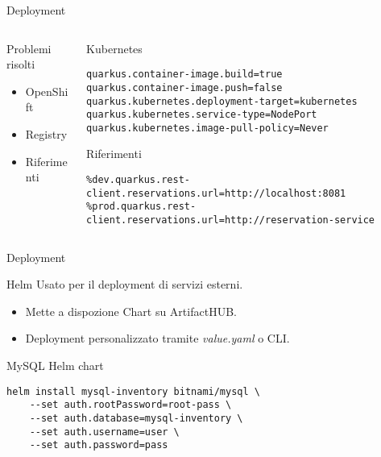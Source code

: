 \begin{frame}[fragile]{Deployment}
    \begin{columns}
        \begin{column}{.3\textwidth}
            \begin{block}{Problemi risolti}
                \begin{itemize}
                    \item OpenShift
                    \item Registry
                    \item Riferimenti
                \end{itemize}
            \end{block}
        \end{column}
        \begin{column}{.7\textwidth}
            \begin{block}{Kubernetes}
                \begin{verbatim}
quarkus.container-image.build=true
quarkus.container-image.push=false
quarkus.kubernetes.deployment-target=kubernetes
quarkus.kubernetes.service-type=NodePort
quarkus.kubernetes.image-pull-policy=Never
                \end{verbatim}
            \end{block}
            \begin{block}{Riferimenti}
                \begin{verbatim}
%dev.quarkus.rest-client.reservations.url=http://localhost:8081
%prod.quarkus.rest-client.reservations.url=http://reservation-service
                \end{verbatim}
            \end{block}
        \end{column}
    \end{columns}
\end{frame}

\begin{frame}[fragile]{Deployment}
    \begin{block}{Helm}
        Usato per il deployment di servizi esterni.
        \begin{itemize}
            \item Mette a dispozione Chart su ArtifactHUB.
            \item Deployment personalizzato tramite \textit{value.yaml} o CLI.
        \end{itemize}
    \end{block}
    \begin{block}{MySQL Helm chart}
        \begin{verbatim}
helm install mysql-inventory bitnami/mysql \
    --set auth.rootPassword=root-pass \
    --set auth.database=mysql-inventory \
    --set auth.username=user \
    --set auth.password=pass
        \end{verbatim}
    \end{block}
\end{frame}